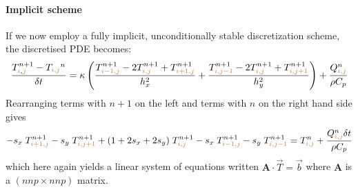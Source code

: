\paragraph{Implicit scheme} 
If we now employ a fully implicit, unconditionally stable discretization scheme, the discretised 
PDE becomes:
\begin{equation}
\frac{T_{{\color{brown}i},{\color{brown}j}}^{n+1}-T_{\color{brown}i,j}^n}{\delta t}
= \kappa
\left(
\frac{ T_{{\color{brown}i-1,j}}^{n+1}-2T_{{\color{brown}i,j}}^{n+1}+T_{{\color{brown}i+1,j}}^{n+1} }{h_x^2} + 
\frac{ T_{{\color{brown}i,j-1}}^{n+1}-2T_{{\color{brown}i,j}}^{n+1}+T_{{\color{brown}i,j+1}}^{n+1} }{h_y^2}
\right)
+\frac{Q_{{\color{brown}i,j}}^n}{\rho C_p}
\end{equation}
Rearranging terms with $n+1$ on the left and terms with $n$ on the right hand side gives
\begin{equation}
-s_x\; T_{{\color{brown}i+1,j}}^{n+1}
-s_y\; T_{{\color{brown}i,j+1}}^{n+1} 
+(1+2s_x+2s_y)\; T_{{\color{brown}i,j}}^{n+1} 
-s_x\;  T_{{\color{brown}i-1,j}}^{n+1} 
-s_y\;  T_{{\color{brown}i,j-1}}^{n+1} 
=
T_{{\color{brown}i,j}}^n
+\frac{Q_{{\color{brown}i,j}}^n \delta t}{\rho C_p}
\end{equation}
which here again yields a linear system of equations written ${\bm A}\cdot {\vec T} = {\vec b}$
where ${\bm A}$ is a $(nnp \times nnp)$ matrix.

